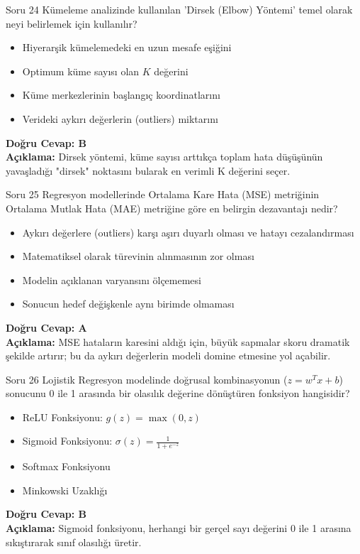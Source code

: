 \documentclass[12pt,a4paper]{article}
\begin{document}
\begin{testcard}{Soru 24}
    Kümeleme analizinde kullanılan 'Dirsek (Elbow) Yöntemi' temel olarak neyi belirlemek için kullanılır?
    \begin{itemize}
        \item[A)] Hiyerarşik kümelemedeki en uzun mesafe eşiğini
        \item[B)] Optimum küme sayısı olan $K$ değerini
        \item[C)] Küme merkezlerinin başlangıç koordinatlarını
        \item[D)] Verideki aykırı değerlerin (outliers) miktarını
    \end{itemize}
    \tcblower
    \textbf{Doğru Cevap: B} \\
    \textbf{Açıklama:} Dirsek yöntemi, küme sayısı arttıkça toplam hata düşüşünün yavaşladığı "dirsek" noktasını bularak en verimli K değerini seçer.
\end{testcard}

\begin{testcard}{Soru 25}
    Regresyon modellerinde Ortalama Kare Hata (MSE) metriğinin Ortalama Mutlak Hata (MAE) metriğine göre en belirgin dezavantajı nedir?
    \begin{itemize}
        \item[A)] Aykırı değerlere (outliers) karşı aşırı duyarlı olması ve hatayı cezalandırması
        \item[B)] Matematiksel olarak türevinin alınmasının zor olması
        \item[C)] Modelin açıklanan varyansını ölçememesi
        \item[D)] Sonucun hedef değişkenle aynı birimde olmaması
    \end{itemize}
    \tcblower
    \textbf{Doğru Cevap: A} \\
    \textbf{Açıklama:} MSE hataların karesini aldığı için, büyük sapmalar skoru dramatik şekilde artırır; bu da aykırı değerlerin modeli domine etmesine yol açabilir.
\end{testcard}
\begin{testcard}{Soru 26}
    Lojistik Regresyon modelinde doğrusal kombinasyonun ($z = w^T x + b$) sonucunu 0 ile 1 arasında bir olasılık değerine dönüştüren fonksiyon hangisidir?
    \begin{itemize}
        \item[A)] ReLU Fonksiyonu: $g(z) = \max(0, z)$
        \item[B)] Sigmoid Fonksiyonu: $\sigma(z) = \frac{1}{1 + e^{-z}}$
        \item[C)] Softmax Fonksiyonu
        \item[D)] Minkowski Uzaklığı
    \end{itemize}
    \tcblower
    \textbf{Doğru Cevap: B} \\
    \textbf{Açıklama:} Sigmoid fonksiyonu, herhangi bir gerçel sayı değerini 0 ile 1 arasına sıkıştırarak sınıf olasılığı üretir.
\end{testcard}
\end{document}

